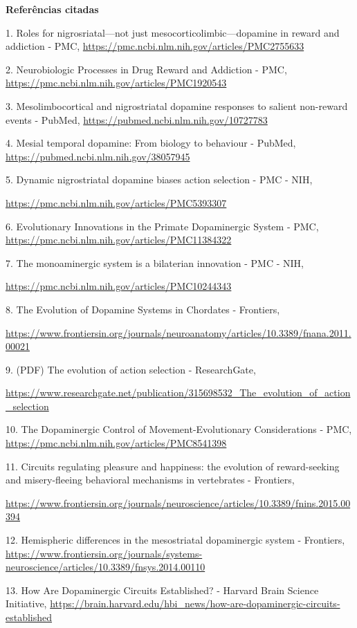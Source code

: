 \textbf{Referências citadas}

1. Roles for nigrosriatal---not just mesocorticolimbic---dopamine in reward and addiction - PMC, \url{https://pmc.ncbi.nlm.nih.gov/articles/PMC2755633}

2. Neurobiologic Processes in Drug Reward and Addiction - PMC, \url{https://pmc.ncbi.nlm.nih.gov/articles/PMC1920543}

3. Mesolimbocortical and nigrostriatal dopamine responses to salient non-reward events - PubMed, \url{https://pubmed.ncbi.nlm.nih.gov/10727783}

4. Mesial temporal dopamine: From biology to behaviour - PubMed, \url{https://pubmed.ncbi.nlm.nih.gov/38057945}

5. Dynamic nigrostriatal dopamine biases action selection - PMC - NIH,

\url{https://pmc.ncbi.nlm.nih.gov/articles/PMC5393307}

6. Evolutionary Innovations in the Primate Dopaminergic System - PMC, \url{https://pmc.ncbi.nlm.nih.gov/articles/PMC11384322}

7. The monoaminergic system is a bilaterian innovation - PMC - NIH,

\url{https://pmc.ncbi.nlm.nih.gov/articles/PMC10244343}

8. The Evolution of Dopamine Systems in Chordates - Frontiers,

\url{https://www.frontiersin.org/journals/neuroanatomy/articles/10.3389/fnana.2011.00021}

9. (PDF) The evolution of action selection - ResearchGate,

\url{https://www.researchgate.net/publication/315698532_The_evolution_of_action_selection}

10. The Dopaminergic Control of Movement-Evolutionary Considerations - PMC, \url{https://pmc.ncbi.nlm.nih.gov/articles/PMC8541398}

11. Circuits regulating pleasure and happiness: the evolution of reward-seeking and misery-fleeing behavioral mechanisms in vertebrates - Frontiers,

\url{https://www.frontiersin.org/journals/neuroscience/articles/10.3389/fnins.2015.00394}

12. Hemispheric differences in the mesostriatal dopaminergic system - Frontiers, \url{https://www.frontiersin.org/journals/systems-neuroscience/articles/10.3389/fnsys.2014.00110}

13. How Are Dopaminergic Circuits Established? - Harvard Brain Science Initiative, \url{https://brain.harvard.edu/hbi_news/how-are-dopaminergic-circuits-established}

